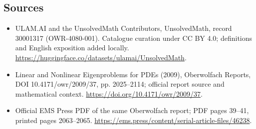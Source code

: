 \documentclass[11pt]{article}
\begin{document}
\subsection{Sources}
\begin{itemize}
\item[\hypertarget{source:30001317:1}{S1}] ULAM.AI and the UnsolvedMath Contributors, UnsolvedMath, record 30001317 (OWR-4080-001). Catalogue curation under CC BY 4.0; definitions and English exposition added locally.
\url{https://huggingface.co/datasets/ulamai/UnsolvedMath}.
\item[\hypertarget{source:30001317:2}{S2}] Linear and Nonlinear Eigenproblems for PDEs (2009), Oberwolfach Reports, DOI 10.4171/owr/2009/37, pp. 2025--2114; official report source and mathematical context.
\url{https://doi.org/10.4171/owr/2009/37}.
\item[\hypertarget{source:30001317:3}{S3}] Official EMS Press PDF of the same Oberwolfach report; PDF pages 39--41, printed pages 2063--2065.
\url{https://ems.press/content/serial-article-files/46238}.
\end{itemize}
\label{end:30001317}
\end{document}
